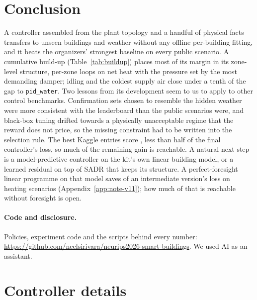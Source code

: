 \documentclass{article}
\begin{document}
\section{Conclusion}
\label{sec:conclusion}
A controller assembled from the plant topology and a handful of physical facts transfers to unseen buildings and weather without any offline per-building fitting, and it beats the organizers' strongest baseline on every public scenario. A cumulative build-up (Table~\ref{tab:buildup}) places most of its margin in its zone-level structure, per-zone loops on net heat with the pressure set by the most demanding damper; idling and the coldest supply air close under a tenth of the gap to \texttt{pid\_water}. Two lessons from its development seem to us to apply to other control benchmarks. Confirmation sets chosen to resemble the hidden weather were more consistent with the leaderboard than the public scenarios were, and black-box tuning drifted towards a physically unacceptable regime that the reward does not price, so the missing constraint had to be written into the selection rule. The best Kaggle entries score \FinKagBest, less than half of the final controller's loss, so much of the remaining gain is reachable. A natural next step is a model-predictive controller on the kit's own linear building model, or a learned residual on top of SADR that keeps its structure. A perfect-foresight linear programme on that model saves \RElvLpMean{} of an intermediate version's loss on \RElvLpN{} heating scenarios (Appendix~\ref{app:note-v11}); how much of that is reachable without foresight is open.

\paragraph{Code and disclosure.} Policies, experiment code and the scripts behind every number: \url{https://github.com/neelsirivara/neurips2026-smart-buildings}. We used AI as an assistant.



\clearpage
\appendix
\let\oldsection\section
\renewcommand{\section}{\FloatBarrier\oldsection}
\section{Controller details}
\label{app:figs}
\end{document}
